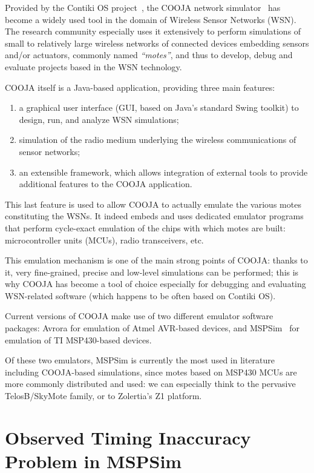 \documentclass[a4paper,10pt]{article}
\begin{document}
Provided by the Contiki OS project~\cite{ContikiOS}, the COOJA network
simulator~\cite{Cooja} has become a widely used tool in the domain of
Wireless Sensor Networks (WSN). The research community especially uses
it extensively to perform simulations of small to relatively large wireless
networks of connected devices embedding sensors and/or actuators, commonly
named \emph{``motes''}, and thus to develop, debug and evaluate projects
based in the WSN technology.

COOJA itself is a Java-based application, providing three main features:
\begin{enumerate}
\item a graphical user interface (GUI, based on Java's standard Swing toolkit)
to design, run, and analyze WSN simulations;
\item simulation of the radio medium underlying the wireless communications
of sensor networks;
\item an extensible framework, which allows integration of external tools
to provide additional features to the COOJA application.
\end{enumerate}
This last feature is used to allow COOJA to actually emulate the various
motes constituting the WSNs. It indeed embeds and uses dedicated emulator
programs that perform cycle-exact emulation of the chips with which motes
are built: microcontroller units (MCUs), radio transceivers, etc.

This emulation mechanism is one of the main strong points of COOJA:
thanks to it, very fine-grained, precise and low-level simulations
can be performed; this is why COOJA has become a tool of choice especially
for debugging and evaluating WSN-related software (which happens to be
often based on Contiki OS).

Current versions of COOJA make use of two different emulator software
packages: Avrora for emulation of Atmel AVR-based devices, and
MSPSim~\cite{MSPSim} for emulation of TI MSP430-based devices.

Of these two emulators, MSPSim is currently the most used in literature
including COOJA-based simulations, since motes based on MSP430 MCUs are
more commonly distributed and used: we can especially think to the pervasive
TelosB/SkyMote family, or to Zolertia's Z1 platform.


\section{Observed Timing Inaccuracy Problem in MSPSim}
\end{document}
